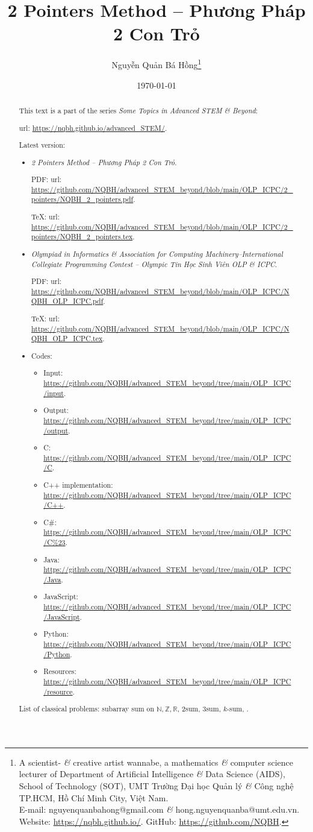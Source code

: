 \documentclass{article}
\title{2 Pointers Method -- Phương Pháp 2 Con Trỏ}
\author{Nguyễn Quản Bá Hồng\footnote{A scientist- {\it\&} creative artist wannabe, a mathematics {\it\&} computer science lecturer of Department of Artificial Intelligence {\it\&} Data Science (AIDS), School of Technology (SOT), UMT Trường Đại học Quản lý {\it\&} Công nghệ TP.HCM, Hồ Chí Minh City, Việt Nam.\\E-mail: {\sf nguyenquanbahong@gmail.com} {\it\&} {\sf hong.nguyenquanba@umt.edu.vn}. Website: \url{https://nqbh.github.io/}. GitHub: \url{https://github.com/NQBH}.}}
\date{\today}
\begin{document}
\maketitle
\begin{abstract}
    This text is a part of the series {\it Some Topics in Advanced STEM \& Beyond}:

    {\sc url}: \url{https://nqbh.github.io/advanced_STEM/}.

    Latest version:
    \begin{itemize}
        \item {\it 2 Pointers Method -- Phương Pháp 2 Con Trỏ}.

        PDF: {\sc url}: \url{https://github.com/NQBH/advanced_STEM_beyond/blob/main/OLP_ICPC/2_pointers/NQBH_2_pointers.pdf}.

        \TeX: {\sc url}: \url{https://github.com/NQBH/advanced_STEM_beyond/blob/main/OLP_ICPC/2_pointers/NQBH_2_pointers.tex}.
        \item {\it Olympiad in Informatics \& Association for Computing Machinery--International Collegiate Programming Contest -- Olympic Tin Học Sinh Viên OLP \& ICPC}.

        PDF: {\sc url}: \url{https://github.com/NQBH/advanced_STEM_beyond/blob/main/OLP_ICPC/NQBH_OLP_ICPC.pdf}.

        \TeX: {\sc url}: \url{https://github.com/NQBH/advanced_STEM_beyond/blob/main/OLP_ICPC/NQBH_OLP_ICPC.tex}.
        \item Codes:
        \begin{itemize}
            \item Input: \url{https://github.com/NQBH/advanced_STEM_beyond/tree/main/OLP_ICPC/input}.
            \item Output: \url{https://github.com/NQBH/advanced_STEM_beyond/tree/main/OLP_ICPC/output}.
            \item C: \url{https://github.com/NQBH/advanced_STEM_beyond/tree/main/OLP_ICPC/C}.
            \item C++ implementation: \url{https://github.com/NQBH/advanced_STEM_beyond/tree/main/OLP_ICPC/C++}.
            \item C\#: \url{https://github.com/NQBH/advanced_STEM_beyond/tree/main/OLP_ICPC/C%23}.
            \item Java: \url{https://github.com/NQBH/advanced_STEM_beyond/tree/main/OLP_ICPC/Java}.
            \item JavaScript: \url{https://github.com/NQBH/advanced_STEM_beyond/tree/main/OLP_ICPC/JavaScript}.
            \item Python: \url{https://github.com/NQBH/advanced_STEM_beyond/tree/main/OLP_ICPC/Python}.
            \item Resources: \url{https://github.com/NQBH/advanced_STEM_beyond/tree/main/OLP_ICPC/resource}.
        \end{itemize}
    \end{itemize}
    List of classical problems: subarray sum on $\mathbb{N},\mathbb{Z},\mathbb{R}$, {\sc2sum}, {\sc3sum}, $k$-sum, .
\end{abstract}
\tableofcontents
\end{document}
